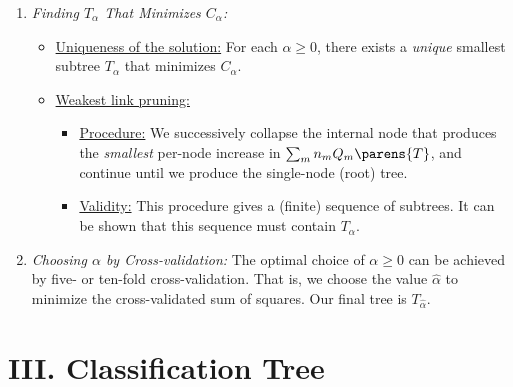 \documentclass[12pt]{article}
\begin{document}
\begin{enumerate}[label=\textbf{\arabic*.}]
\begin{enumerate}
		\item \textit{Finding $T_{\alpha}$ That Minimizes $C_{\alpha}$:} 
		\begin{itemize}
			\item \underline{Uniqueness of the solution:} For each $\alpha \ge 0$, there exists a \emph{unique} smallest subtree $T_{\alpha}$ that minimizes $C_{\alpha}$. 
			\item \underline{Weakest link pruning:} 
			\begin{itemize}
				\item \underline{Procedure:} We successively collapse the internal node that produces the \emph{smallest} per-node increase in $\sum_{m} n_m Q_m \parens{T}$, and continue until we produce the single-node (root) tree. 
				\item \underline{Validity:} This procedure gives a (finite) sequence of subtrees. It can be shown that this sequence must contain $T_{\alpha}$. 
			\end{itemize}
		\end{itemize}
		
		\item \textit{Choosing $\alpha$ by Cross-validation:} The optimal choice of $\alpha \ge 0$ can be achieved by five- or ten-fold cross-validation. That is, we choose the value $\hat{\alpha}$ to minimize the cross-validated sum of squares. Our final tree is $T_{\hat{\alpha}}$. 
	\end{enumerate}

\end{enumerate}


\section*{III. Classification Tree}
\end{document}
